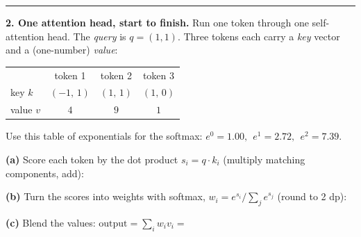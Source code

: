 \documentclass[11pt]{article}
\newif\ifsolution
\newcommand{\blk}[1]{\underline{\hspace{#1}}}
\newcommand{\keybox}[1]{\ifsolution\par\vspace{2pt}%
  \fbox{\parbox{0.965\textwidth}{\small\textbf{Answer.}\; #1}}\par\fi}
\newcommand{\work}[1]{\ifsolution\else\vspace{#1}\fi}
\begin{document}
\work{1.0cm}
\ifsolution\else\blk{\linewidth}\fi

\keybox{(a) \textbf{chickens} (weight 0.60, by far the darkest cell).
(b) \textbf{``they'' is a pronoun and its referent is the chickens} --- resolving a pronoun to the
thing it stands for (\emph{coreference}) is exactly the kind of long-range link attention is good at,
and the giveaway is \textbf{number agreement}: ``they'' is plural and \emph{chickens} is the only
plural noun in the sentence, so the singular \emph{farmer} is ruled out. Nobody wrote that rule ---
the model learned it from text. (The same picture on a peptide would show a head lighting up on,
say, a charge pair; same machinery, different vocabulary.)}

\vspace{2pt}\hrule\vspace{5pt}

\textbf{2. One attention head, start to finish.}\; {\small Run one token through one self-attention
head. The \emph{query} is $q=(1,1)$. Three tokens each carry a \emph{key} vector and a (one-number)
\emph{value}:}

\vspace{3pt}
\begin{center}
\begin{tabular}{lccc}
 & token 1 & token 2 & token 3\\[2pt]
key $k$ & $(-1,\,1)$ & $(1,\,1)$ & $(1,\,0)$\\[2pt]
value $v$ & $4$ & $9$ & $1$\\
\end{tabular}
\end{center}

{\small Use this table of exponentials for the softmax: $e^{0}=1.00,\ \ e^{1}=2.72,\ \ e^{2}=7.39$.}

\vspace{4pt}
\textbf{(a)} Score each token by the dot product $s_i = q\cdot k_i$ (multiply matching components, add):

\work{0.9cm}
\ifsolution\else\blk{\linewidth}\fi

\textbf{(b)} Turn the scores into weights with softmax, $w_i = e^{s_i}/\sum_j e^{s_j}$ (round to 2 dp):

\work{0.9cm}
\ifsolution\else\blk{\linewidth}\fi

\textbf{(c)} Blend the values: $\text{output} = \sum_i w_i v_i =$

\work{0.9cm}
\ifsolution\else\blk{\linewidth}\fi
\end{document}
